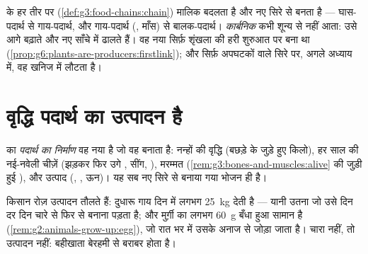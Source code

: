 \begin{remark}\label{rem:g6:matter-from-food:hands}
 के हर तीर पर
(\cref{def:g3:food-chains:chain})  मालिक बदलता है और
नए सिरे से बनता है --- घास-पदार्थ से गाय-पदार्थ, और गाय-पदार्थ (,
माँस) से बालक-पदार्थ। \emph{कार्बनिक} कभी शून्य से नहीं आता: 
उसे आगे बढ़ाते और नए साँचे में ढालते हैं। वह नया सिर्फ़ शृंखला की हरी
शुरुआत पर बना था
(\cref{prop:g6:plants-are-producers:firstlink}); और सिर्फ़ अपघटकों वाले
सिरे पर, अगले अध्याय में, वह खनिज में लौटता है।
\end{remark}

\section{वृद्धि पदार्थ का उत्पादन है}

\begin{definition}[जंतु का पदार्थ-उत्पादन]\label{def:g6:matter-from-food:production}
 का \emph{पदार्थ का निर्माण} वह नया
 है जो वह बनाता है: नन्हों की वृद्धि (बछड़े के जुड़े हुए
किलो), हर साल की नई-नवेली चीज़ें (झड़कर फिर उगे , सींग, ), मरम्मत
(\cref{rem:g3:bones-and-muscles:alive} की जुड़ी हुई ), और उत्पाद
(, , ऊन)। यह सब नए सिरे से बनाया गया भोजन ही है।
\end{definition}

\begin{example}[उत्पादन तौलना]\label{ex:g6:matter-from-food:weighing}
किसान रोज़ उत्पादन तौलते हैं: दुधारू गाय दिन में लगभग \qty{25}{kg} 
देती है --- यानी उतना  जो उसे दिन दर दिन चारे से फिर से
बनाना पड़ता है; और मुर्ग़ी का  लगभग \qty{60}{g} बँधा हुआ सामान है
(\cref{rem:g2:animals-grow-up:egg}), जो रात भर में उसके अनाज से जोड़ा
जाता है। चारा नहीं, तो उत्पादन नहीं: बहीखाता बेरहमी से बराबर होता है।
\end{example}

